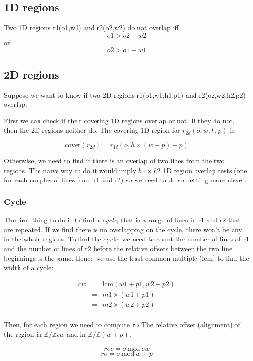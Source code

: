\documentclass[twocolumn]{article}
\begin{document}
\subsection{1D regions}

Two 1D regions r1(o1,w1) and r2(o2,w2) do not overlap iff 
\[ o1 > o2+w2 \] or \[o2 > o1 + w1 \]

\subsection{2D regions}

Suppose we want to know if two 2D regions r1(o1,w1,h1,p1) and r2(o2,w2,h2,p2)
overlap.

First we can check if their covering 1D regions overlap or not. If they do not,
then the 2D regions neither do. The covering 1D region for $r_{2d}(o,w,h,p)$ is:

\[ \textrm{cover}(r_{2d}) = r_{1d}(o, h \times (w + p) - p) \]

Otherwise, we need to find if there is an overlap of two lines from the two
regions. The naive way to do it would imply $h1 \times h2$ 1D region overlap
tests (one for each couples of lines from r1 and r2) so we need to do something
more clever.

\subsubsection{Cycle}

The first thing to do is to find a \emph{cycle}, that is a range of lines in r1
and r2 that are repeated. If we find there is no overlapping on the cycle, there
won't be any in the whole regions. To find the cycle, we need to count the number
of lines of r1 and the number of lines of r2 before the relative offsets between
the two line beginnings is the same. Hence we use the least common multiple
(lcm) to find the width of a cycle:

\[
\begin{array}{rcl}
cw &=& \textrm{lcm} (w1+p1,w2+p2) \\
   &=& m1 \times (w1 + p1) \\ 
   &=& m2 \times (w2 + p2) \\
\end{array}
\]

Then, for each region we need to compute \textbf{ro} The relative offset
(alignment) of the region in $\mathbb{Z}/\mathbb{Z}cw$ and in
$\mathbb{Z}/\mathbb{Z}(w+p)$.

\[ roc = o\ \textrm{mod}\ cw \]
\[ ro  = o\ \textrm{mod}\ w + p \]
\end{document}
